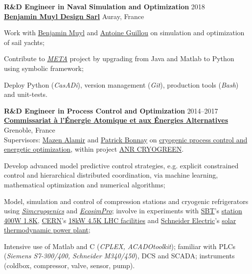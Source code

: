 \documentclass[a4paper,11pt]{article}
\begin{document}
	\vspace{0.1cm}
	
	\textbf{R\&D Engineer in Naval Simulation and Optimization}
	\hfill {2018} \\
	\href{https://www.bmuyl.com/}{\textbf{Benjamin Muyl Design Sarl}} 
	\hfill{Auray, France}
	\begin{innerlist}
		\item Work with \href{https://www.linkedin.com/in/bmuyl/}{Benjamin Muyl} and \href{https://www.linkedin.com/in/antoine-guillou-40379526/}{Antoine Guillou} on simulation and optimization of sail yachts;
		\item Contribute to \href{https://pole-mer-bretagne-atlantique.com/en/component/projects/project/2235}{\emph{META}} project by upgrading from Java and Matlab to Python using symbolic framework; 
		\item Deploy Python (\emph{CasADi}), version management (\emph{Git}), production tools (\emph{Bash}) and unit-tests.
	\end{innerlist}
	
	\vspace{0.1cm}
	
	\textbf{R\&D Engineer in Process Control and Optimization}
	\hfill {2014--2017} \\
	\href{http://www.cea.fr/}{\textbf{Commissariat \`{a} l'\'{E}nergie Atomique et aux \'{E}nergies Alternatives}} 
	\hfill{Grenoble, France} \\
	Supervisors: \href{http://www.mazenalamir.fr/home/}{Mazen Alamir} and \href{https://www.researchgate.net/profile/P_Bonnay}{Patrick Bonnay} on \href{https://vuongvtrinh.github.io/project/cryogenic-refrigerator/}{cryogenic process control and energetic optimization}, within project \href{https://anr.fr/Project-ANR-13-SEED-0005}{ANR CRYOGREEN}.
	\begin{innerlist}
		\item Develop advanced model predictive control strategies, e.g. explicit constrained control and hierarchical distributed coordination, via machine learning, mathematical optimization and numerical algorithms;
		\item Model, simulation and control of compression stations and cryogenic refrigerators using \href{http://www.d-sbt.fr/en/Pages/News/2016_Francois-Bonne.aspx}{\emph{Simcryogenics}} and \href{https://www.ecosimpro.com/}{\emph{EcosimPro}}; involve in experiments with \href{http://www.d-sbt.fr/en}{SBT}'s \href{http://inac.cea.fr/en/Phocea/Vie_des_labos/Ast/ast_visu.php?id_ast=771}{station 400W 1.8K}, \href{https://cern.ch}{CERN}'s \href{https://cds.cern.ch/record/708291}{18kW 4.5K LHC facilities} and \href{https://www.se.com/vn/en/}{Schneider Electric}'s \href{https://vuongvtrinh.github.io/project/solar-energy/}{solar thermodynamic power plant};
		\item Intensive use of Matlab and C (\emph{CPLEX, ACADOtoolkit}); familiar with PLCs (\emph{Siemens S7-300/400, Schneider M340/450}), DCS and SCADA; instruments (coldbox, compressor, valve, sensor, pump).
	\end{innerlist}
	
\end{document}
